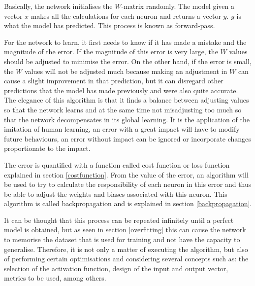 Basically, the network initialises the $W$-matrix randomly. The model given a vector $x$ makes all the calculations for each neuron and returns a vector $y$. $y$ is what the model has predicted. This process is known as forward-pass.
\newline

For the network to learn, it first needs to know if it has made a mistake and the magnitude of the error. If the magnitude of this error is very large, the $W$ values should be adjusted to minimise the error. On the other hand, if the error is small, the $W$ values will not be adjusted much because making an adjustment in $W$ can cause a slight improvement in that prediction, but it can disregard other predictions that the model has made previously and were also quite accurate. The elegance of this algorithm is that it finds a balance between adjusting values so that the network learns and at the same time not misadjusting too much so that the network decompensates in its global learning. It is the application of the imitation of human learning, an error with a great impact will have to modify future behaviours, an error without impact can be ignored or incorporate changes proportionate to the impact.
\newline


The error is quantified with a function called cost function or loss function explained in section \ref{costfunction}. From the value of the error, an algorithm will be used to try to calculate the responsibility of each neuron in this error and thus be able to adjust the weights and biases associated with this neuron. This algorithm is called backpropagation and is explained in section \ref{backpropagation}.
\newline

It can be thought that this process can be repeated infinitely until a perfect model is obtained, but as seen in section \ref{overfitting} this can cause the network to memorise the dataset that is used for training and not have the capacity to generalise. Therefore, it is not only a matter of executing the algorithm, but also of performing certain optimisations and considering several concepts such as: the selection of the activation function, design of the input and output vector, metrics to be used, among others.
\newline

\label{p:company_backpropagation}

